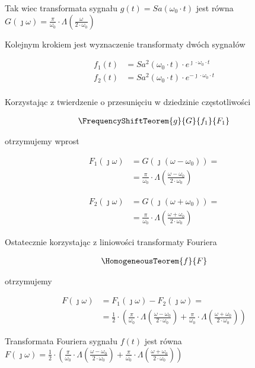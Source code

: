 \begin{task}
Tak wiec transformata sygnału $g(t)=Sa\left(\omega_0 \cdot t\right)$ jest równa $G(\jmath \omega)=\frac{\pi}{ \omega_0 } \cdot \Lambda\left( \frac{\omega}{2\cdot \omega_0}\right)$

Kolejnym krokiem jest wyznaczenie transformaty dwóch sygnałów

\begin{align*}
f_1(t)&=Sa^2\left(\omega_0 \cdot t\right) \cdot e^{\jmath \cdot \omega_0 \cdot t}\\
f_2(t)&=Sa^2\left(\omega_0 \cdot t\right) \cdot e^{-\jmath \cdot \omega_0 \cdot t}\\
\end{align*}

Korzystając z twierdzenie o przesunięciu w dziedzinie częstotliwości

\begin{align*}
\FrequencyShiftTeorem{g}{G}{f_1}{F_1}
\end{align*}

otrzymujemy wprost

\begin{align*}
F_1(\jmath \omega)&=G\left(\jmath \left(\omega -\omega_0\right)\right)=\\
&=\frac{\pi}{ \omega_0 } \cdot \Lambda\left( \frac{\omega - \omega_0}{2\cdot \omega_0}\right)
\end{align*}

\begin{align*}
F_2(\jmath \omega)&=G\left(\jmath \left(\omega +\omega_0\right)\right)=\\
&=\frac{\pi}{ \omega_0 } \cdot \Lambda\left( \frac{\omega + \omega_0}{2\cdot \omega_0}\right)
\end{align*}

Ostatecznie korzystając z liniowości transformaty Fouriera

\begin{align*}
\HomogeneousTeorem{f}{F}
\end{align*}

otrzymujemy

\begin{align*}
F(\jmath \omega)&=F_1(\jmath \omega)-F_2(\jmath \omega)=\\
&=\frac{1}{2} \cdot \left( \frac{\pi}{ \omega_0 } \cdot \Lambda\left( \frac{\omega - \omega_0}{2\cdot \omega_0}\right) + \frac{\pi}{ \omega_0 } \cdot \Lambda\left( \frac{\omega + \omega_0}{2\cdot \omega_0}\right) \right)
\end{align*}


Transformata Fouriera sygnału $f(t)$ jest równa $F(\jmath \omega)=\frac{1}{2 } \cdot \left( \frac{\pi}{ \omega_0 } \cdot \Lambda\left( \frac{\omega - \omega_0}{2\cdot \omega_0}\right) + \frac{\pi}{ \omega_0 } \cdot \Lambda\left( \frac{\omega + \omega_0}{2\cdot \omega_0}\right) \right)$

\end{task}

